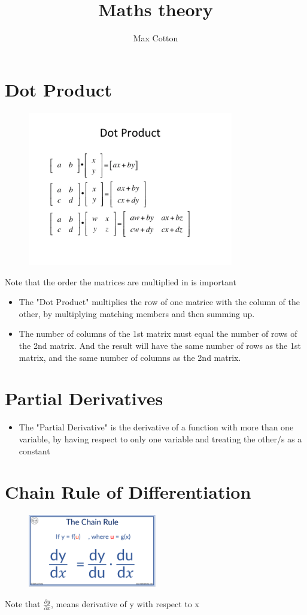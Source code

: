 \documentclass[10pt,a4paper]{article}
\title{Maths theory}
\author{Max Cotton}
\date{}
\begin{document}
\maketitle

\section{Dot Product}

\begin{figure}[h!]
\centering
\includegraphics[width=0.8\textwidth]{src/images/dot-product.png}
\end{figure}

Note that the order the matrices are multiplied in is important

\begin{itemize}
    \item The "Dot Product" multiplies the row of one matrice with the column of the other, by multiplying matching members and then summing up. 
    \item The number of columns of the 1st matrix must equal the number of rows of the 2nd matrix. And the result will have the same number of rows as the 1st matrix, and the same number of columns as the 2nd matrix.
\end{itemize}

\section{Partial Derivatives}

\begin{itemize}
    \item The "Partial Derivative" is the derivative of a function with more than one variable, by having respect to only one variable and treating the other/s as a constant
\end{itemize}

\section{Chain Rule of Differentiation}

\begin{figure}[h!]
\centering
\includegraphics[width=0.5\textwidth]{src/images/chain-rule.png}
\end{figure}

Note that $\frac{\partial{y}}{\partial{x}}$, means derivative of y with respect to x
\end{document}
